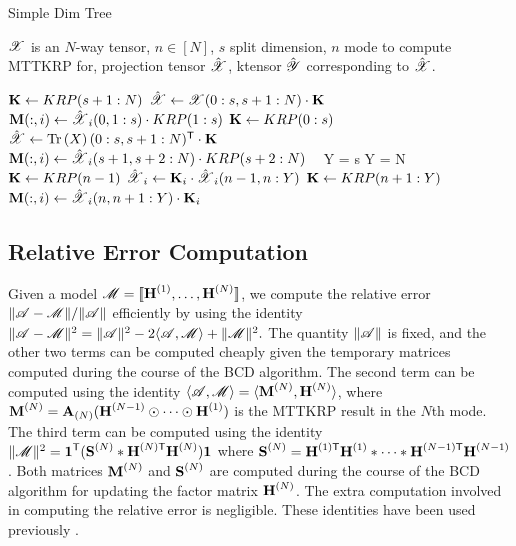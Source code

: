 \begin{algorithm}
\caption{Simple Dim Tree}
\label{alg:simpleDT}
\begin{algorithmic}
\Require $\T{X}$ is an $N$-way tensor, $n \in [N]$, $s$ split dimension, $n$ mode to compute MTTKRP for, projection tensor $\hat{\T{X}}$, ktensor $\hat{\T{Y}}$ corresponding to $\hat{\T{X}}$.

		\State $\M{K} \leftarrow KRP(s+1:N)$
		\State $\hat{\T{X}} \leftarrow \T{X}(0:s,s+1:N) \cdot \M{K}$
			\State $\M{M}(:,i) \leftarrow \hat{\T{X}}_i(0,1:s) \cdot KRP(1:s)$
		\EndFor
	\Else %
		\State $\M{K} \leftarrow KRP(0:s)$
		\State $\hat{\T{X}} \leftarrow \Tr{X}(0:s,s+1:N)^\Tra \cdot \M{K}$
			\State $\M{M}(:,i) \leftarrow \hat{\T{X}}_i(s+1,s+2:N) \cdot KRP(s+2:N)$
		\EndFor
	\EndIf
\
\Else
		\State Y = s
	\Else
		\State Y = N
	\EndIf
		\State  $\M{K} \leftarrow KRP(n-1)$
		\State $\hat{\T{X}}_i \leftarrow \M{K}_i \cdot \hat{\T{X}}_i(n-1,n:Y)$ %
	\EndFor
		\State  $\M{K} \leftarrow KRP(n+1:Y)$
		\State $\M{M}(:,i) \leftarrow \hat{\T{X}}_i(n,n+1:Y) \cdot \M{K}_i$
	\EndFor
\EndIf

\end{algorithmic}
\end{algorithm}

\subsection{Relative Error Computation}
\label{sec:error}

Given a model $\T{M}=\CP$, we compute the relative error $\|\TA - \T{M}\|/\|\TA\|$ efficiently by using the identity $\|\TA-\T{M}\|^2 = \|\TA\|^2 - 2\langle \TA, \T{M} \rangle + \|\T{M}\|^2.$
The quantity $\|\TA\|$ is fixed, and the other two terms can be computed cheaply given the temporary matrices computed during the course of the BCD algorithm.
The second term can be computed using the identity $\langle \TA, \T{M} \rangle = \langle \Mn{M}{N}, \Mn{H}{N} \rangle$, where $\Mn{M}{N} = \Mz{A}{N} (\Mn{H}{N-1} \Khat \cdots \Khat \Mn{H}{1})$ is the MTTKRP result in the $N$th mode.
The third term can be computed using the identity $\|\T{M}\|^2 = \V{1}^\Tra(\Mn{S}{N} \Hada \MnTra{H}{N} \Mn{H}{N})\V{1}$ where $\Mn{S}{N}=\MnTra{H}{1} \Mn{H}{1} \Hada \cdots \Hada \MnTra{H}{N-1} \Mn{H}{N-1}$.
Both matrices $\Mn{M}{N}$ and $\Mn{S}{N}$ are computed during the course of the BCD algorithm for updating the factor matrix $\Mn{H}{N}$.
The extra computation involved in computing the relative error is negligible.
These identities have been used previously \cite{KB2009,TensorBox,SK16,LKLHS2017}.

